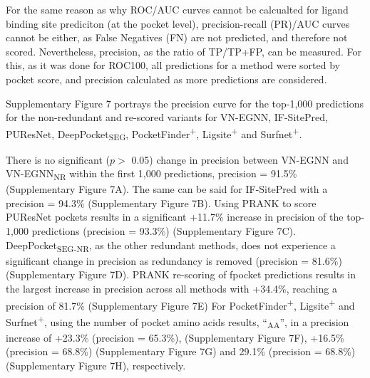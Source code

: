 For the same reason as why ROC/AUC curves cannot be calcualted for ligand binding site prediciton (at the pocket level), precision-recall (PR)/AUC curves cannot be either, as False Negatives (FN) are not predicted, and therefore not scored. Nevertheless, precision, as the ratio of TP/TP+FP, can be measured. For this, as it was done for ROC100, all predictions for a method were sorted by pocket score, and precision calculated as more predictions are considered.

Supplementary Figure 7 portrays the precision curve for the top-1,000 predictions for the non-redundant and re-scored variants for VN-EGNN, IF-SitePred, PUResNet, DeepPocket\textsubscript{SEG}, PocketFinder\textsuperscript{+}, Ligsite\textsuperscript{+} and Surfnet\textsuperscript{+}.

There is no significant ($p >$ 0.05) change in precision between VN-EGNN and VN-EGNN\textsubscript{NR} within the first 1,000 predictions, precision = 91.5\% (Supplementary Figure 7A). The same can be said for IF-SitePred with a precision = 94.3\% (Supplementary Figure 7B). Using PRANK to score PUResNet pockets results in a significant +11.7\% increase in precision of the top-1,000 predictions (precision = 93.3\%) (Supplementary Figure 7C). DeepPocket\textsubscript{SEG-NR}, as the other redundant methods, does not experience a significant change in precision as redundancy is removed (precision = 81.6\%) (Supplementary Figure 7D). PRANK re-scoring of fpocket predictions results in the largest increase in precision across all methods with +34.4\%, reaching a precision of 81.7\% (Supplementary Figure 7E) For PocketFinder\textsuperscript{+}, Ligsite\textsuperscript{+} and Surfnet\textsuperscript{+}, using the number of pocket amino acids results, ``\textsubscript{AA}'', in a precision increase of +23.3\% (precision = 65.3\%), (Supplementary Figure 7F), +16.5\% (precision = 68.8\%) (Supplementary Figure 7G) and 29.1\% (precision = 68.8\%) (Supplementary Figure 7H), respectively. 

